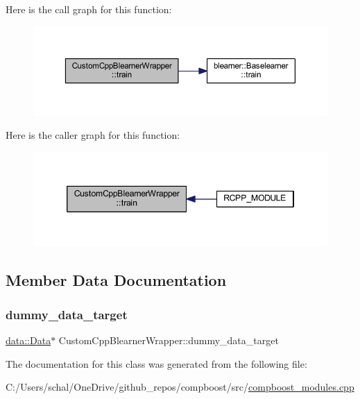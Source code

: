 Here is the call graph for this function\+:\nopagebreak
\begin{figure}[H]
\begin{center}
\leavevmode
\includegraphics[width=350pt]{class_custom_cpp_blearner_wrapper_a84d08ce4754955b5d6ee2e4a66b5b6bc_cgraph}
\end{center}
\end{figure}
Here is the caller graph for this function\+:\nopagebreak
\begin{figure}[H]
\begin{center}
\leavevmode
\includegraphics[width=346pt]{class_custom_cpp_blearner_wrapper_a84d08ce4754955b5d6ee2e4a66b5b6bc_icgraph}
\end{center}
\end{figure}


\subsection{Member Data Documentation}
\mbox{\label{class_custom_cpp_blearner_wrapper_aa7cf022cc61378629f25ba1727c81fe1}} 
\subsubsection{\texorpdfstring{dummy\+\_\+data\+\_\+target}{dummy\_data\_target}}
{\footnotesize\ttfamily \mbox{\hyperlink{classdata_1_1_data}{data\+::\+Data}}$\ast$ Custom\+Cpp\+Blearner\+Wrapper\+::dummy\+\_\+data\+\_\+target\hspace{0.3cm}{\ttfamily [private]}}



The documentation for this class was generated from the following file\+:\begin{DoxyCompactItemize}
\item 
C\+:/\+Users/schal/\+One\+Drive/github\+\_\+repos/compboost/src/\mbox{\hyperlink{compboost__modules_8cpp}{compboost\+\_\+modules.\+cpp}}\end{DoxyCompactItemize}
